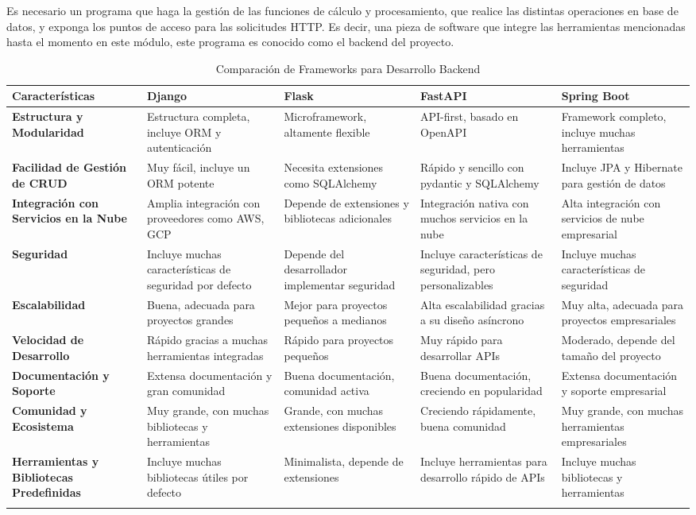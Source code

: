 Es necesario un programa que haga la gestión de las funciones de cálculo y procesamiento, que realice las distintas operaciones en base de datos, y exponga los puntos de acceso para las solicitudes HTTP. Es decir, una pieza de software que integre las herramientas mencionadas hasta el momento en este módulo, este programa es conocido como el backend del proyecto. \\
%
\begin{longtable}{|m{3cm}|m{3cm}|m{3cm}|m{3cm}|m{3cm}|}
\hline
\textbf{Características} & \textbf{Django} & \textbf{Flask} & \textbf{FastAPI} & \textbf{Spring Boot} \\
\hline
\textbf{Estructura y Modularidad} & Estructura completa, incluye ORM y autenticación & Microframework, altamente flexible & API-first, basado en OpenAPI & Framework completo, incluye muchas herramientas \\
\hline
\textbf{Facilidad de Gestión de CRUD} & Muy fácil, incluye un ORM potente & Necesita extensiones como SQLAlchemy & Rápido y sencillo con pydantic y SQLAlchemy & Incluye JPA y Hibernate para gestión de datos \\
\hline
\textbf{Integración con Servicios en la Nube} & Amplia integración con proveedores como AWS, GCP & Depende de extensiones y bibliotecas adicionales & Integración nativa con muchos servicios en la nube & Alta integración con servicios de nube empresarial \\
\hline
\textbf{Seguridad} & Incluye muchas características de seguridad por defecto & Depende del desarrollador implementar seguridad & Incluye características de seguridad, pero personalizables & Incluye muchas características de seguridad \\
\hline
\textbf{Escalabilidad} & Buena, adecuada para proyectos grandes & Mejor para proyectos pequeños a medianos & Alta escalabilidad gracias a su diseño asíncrono & Muy alta, adecuada para proyectos empresariales \\
\hline
\textbf{Velocidad de Desarrollo} & Rápido gracias a muchas herramientas integradas & Rápido para proyectos pequeños & Muy rápido para desarrollar APIs & Moderado, depende del tamaño del proyecto \\
\hline
\textbf{Documentación y Soporte} & Extensa documentación y gran comunidad & Buena documentación, comunidad activa & Buena documentación, creciendo en popularidad & Extensa documentación y soporte empresarial \\
\hline
\textbf{Comunidad y Ecosistema} & Muy grande, con muchas bibliotecas y herramientas & Grande, con muchas extensiones disponibles & Creciendo rápidamente, buena comunidad & Muy grande, con muchas herramientas empresariales \\
\hline
\textbf{Herramientas y Bibliotecas Predefinidas} & Incluye muchas bibliotecas útiles por defecto & Minimalista, depende de extensiones & Incluye herramientas para desarrollo rápido de APIs & Incluye muchas bibliotecas y herramientas \\
\hline
\caption{Comparación de Frameworks para Desarrollo Backend}
\label{tab:comparacion_backend}
\end{longtable}
